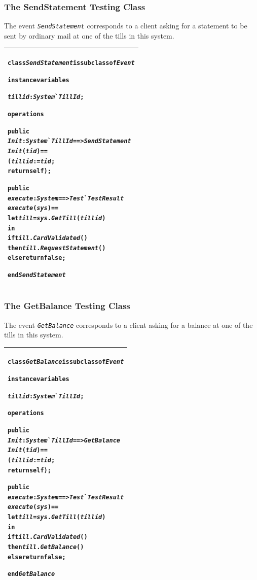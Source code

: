 \documentclass[\pformat,12pt,twoside]{article}
\newenvironment{VDMgray}%
{\begin{tabular}{|G|}\hline\small\begin{alltt}}%
{\end{alltt}\normalsize\\
 \hline\end{tabular}}
\begin{document}
\subsubsection{The SendStatement Testing Class}

The event \texttt{\emph{SendStatement}} corresponds to a client asking for 
a statement to be sent by ordinary mail at one of the tills in 
this system.

\begin{VDMgray}
\textbf{class} \textit{SendStatement} \textbf{is} \textbf{subclass} \textbf{of} \textit{Event}

\textbf{instance} \textbf{variables}

 \textit{tillid} : \textit{System}\`{}\textit{TillId};

\textbf{operations}

 \textbf{public}
 \textit{Init}: \textit{System}\`{}\textit{TillId} ==\texttt{>} \textit{SendStatement}
 \textit{Init}(\textit{tid}) ==
   (\textit{tillid} := \textit{tid};
    \textbf{return} \textbf{self});

 \textbf{public}
 \textit{execute}: \textit{System} ==\texttt{>} \textit{Test}\`{}\textit{TestResult}
 \textit{execute}(\textit{sys}) ==
   \textbf{let} \textit{till} = \textit{sys}.\textit{GetTill}(\textit{tillid})
   \textbf{in}
      \textbf{if} \textit{till}.\textit{CardValidated}()
      \textbf{then} \textit{till}.\textit{RequestStatement}()
      \textbf{else} \textbf{return} \textbf{false};

\textbf{end} \textit{SendStatement}
\end{VDMgray}

\newpage
\subsubsection{The GetBalance Testing Class}

The event \texttt{\emph{GetBalance}} corresponds to a client asking for a 
balance at one of the tills in this system.

\begin{VDMgray}
\textbf{class} \textit{GetBalance} \textbf{is} \textbf{subclass} \textbf{of} \textit{Event}

\textbf{instance} \textbf{variables}

 \textit{tillid} : \textit{System}\`{}\textit{TillId};

\textbf{operations}

 \textbf{public}
 \textit{Init}: \textit{System}\`{}\textit{TillId} ==\texttt{>} \textit{GetBalance}
 \textit{Init}(\textit{tid}) ==
   (\textit{tillid} := \textit{tid};
    \textbf{return} \textbf{self});

 \textbf{public}
 \textit{execute}: \textit{System} ==\texttt{>} \textit{Test}\`{}\textit{TestResult}
 \textit{execute}(\textit{sys}) ==
   \textbf{let} \textit{till} = \textit{sys}.\textit{GetTill}(\textit{tillid})
   \textbf{in}
      \textbf{if} \textit{till}.\textit{CardValidated}()
      \textbf{then} \textit{till}.\textit{GetBalance}()
      \textbf{else} \textbf{return} \textbf{false};

\textbf{end} \textit{GetBalance}
\end{VDMgray}
\end{document}
